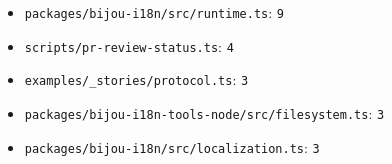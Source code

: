 \begin{itemize}
\tightlist
\item
  \texttt{p\allowbreak{}a\allowbreak{}c\allowbreak{}k\allowbreak{}a\allowbreak{}g\allowbreak{}e\allowbreak{}s\allowbreak{}/\allowbreak{}b\allowbreak{}i\allowbreak{}j\allowbreak{}o\allowbreak{}u\allowbreak{}-\allowbreak{}i\allowbreak{}1\allowbreak{}8\allowbreak{}n\allowbreak{}/\allowbreak{}s\allowbreak{}r\allowbreak{}c\allowbreak{}/\allowbreak{}r\allowbreak{}u\allowbreak{}n\allowbreak{}t\allowbreak{}i\allowbreak{}m\allowbreak{}e\allowbreak{}.\allowbreak{}t\allowbreak{}s}: \texttt{9}
\item
  \texttt{s\allowbreak{}c\allowbreak{}r\allowbreak{}i\allowbreak{}p\allowbreak{}t\allowbreak{}s\allowbreak{}/\allowbreak{}p\allowbreak{}r\allowbreak{}-\allowbreak{}r\allowbreak{}e\allowbreak{}v\allowbreak{}i\allowbreak{}e\allowbreak{}w\allowbreak{}-\allowbreak{}s\allowbreak{}t\allowbreak{}a\allowbreak{}t\allowbreak{}u\allowbreak{}s\allowbreak{}.\allowbreak{}t\allowbreak{}s}: \texttt{4}
\item
  \texttt{e\allowbreak{}x\allowbreak{}a\allowbreak{}m\allowbreak{}p\allowbreak{}l\allowbreak{}e\allowbreak{}s\allowbreak{}/\allowbreak{}\_\allowbreak{}s\allowbreak{}t\allowbreak{}o\allowbreak{}r\allowbreak{}i\allowbreak{}e\allowbreak{}s\allowbreak{}/\allowbreak{}p\allowbreak{}r\allowbreak{}o\allowbreak{}t\allowbreak{}o\allowbreak{}c\allowbreak{}o\allowbreak{}l\allowbreak{}.\allowbreak{}t\allowbreak{}s}: \texttt{3}
\item
  \texttt{p\allowbreak{}a\allowbreak{}c\allowbreak{}k\allowbreak{}a\allowbreak{}g\allowbreak{}e\allowbreak{}s\allowbreak{}/\allowbreak{}b\allowbreak{}i\allowbreak{}j\allowbreak{}o\allowbreak{}u\allowbreak{}-\allowbreak{}i\allowbreak{}1\allowbreak{}8\allowbreak{}n\allowbreak{}-\allowbreak{}t\allowbreak{}o\allowbreak{}o\allowbreak{}l\allowbreak{}s\allowbreak{}-\allowbreak{}n\allowbreak{}o\allowbreak{}d\allowbreak{}e\allowbreak{}/\allowbreak{}s\allowbreak{}r\allowbreak{}c\allowbreak{}/\allowbreak{}f\allowbreak{}i\allowbreak{}l\allowbreak{}e\allowbreak{}s\allowbreak{}y\allowbreak{}s\allowbreak{}t\allowbreak{}e\allowbreak{}m\allowbreak{}.\allowbreak{}t\allowbreak{}s}: \texttt{3}
\item
  \texttt{p\allowbreak{}a\allowbreak{}c\allowbreak{}k\allowbreak{}a\allowbreak{}g\allowbreak{}e\allowbreak{}s\allowbreak{}/\allowbreak{}b\allowbreak{}i\allowbreak{}j\allowbreak{}o\allowbreak{}u\allowbreak{}-\allowbreak{}i\allowbreak{}1\allowbreak{}8\allowbreak{}n\allowbreak{}/\allowbreak{}s\allowbreak{}r\allowbreak{}c\allowbreak{}/\allowbreak{}l\allowbreak{}o\allowbreak{}c\allowbreak{}a\allowbreak{}l\allowbreak{}i\allowbreak{}z\allowbreak{}a\allowbreak{}t\allowbreak{}i\allowbreak{}o\allowbreak{}n\allowbreak{}.\allowbreak{}t\allowbreak{}s}: \texttt{3}

\end{itemize}
